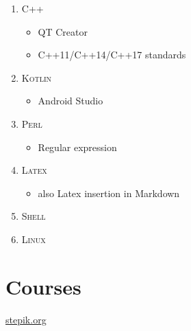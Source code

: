 \documentclass[]{report}
\begin{document}
\begin{enumerate}

\item {
	\textsc{C++}
	\begin{itemize}
		\item {QT Creator}
		\item {C++11/C++14/C++17 standards}
	\end{itemize}
}

\item {
	\textsc{Kotlin}
	\begin{itemize}
		\item {Android Studio}
	\end{itemize}
}

\item {\textsc{Perl}
	\begin{itemize}
		\item {Regular expression}
	\end{itemize}
}

\item {
	\textsc{Latex}
	\begin{itemize}
		\item {also Latex insertion in Markdown}   
	\end{itemize}	   		
}

\item {\textsc{Shell}}

\item {\textsc{Linux}}


\end{enumerate}

\section*{\Large Courses}
	 \href{https://stepik.org/users/20189089/certificates}{stepik.org}
\end{document}
